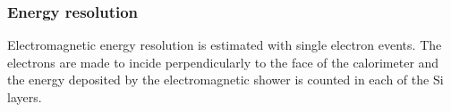\subsubsection{Energy resolution}
\label{subsubsec:energyresol}

Electromagnetic energy resolution is estimated with single electron events.
The electrons are made to incide perpendicularly to the face of the calorimeter and the energy deposited by the electromagnetic shower is counted in each of the Si layers.
